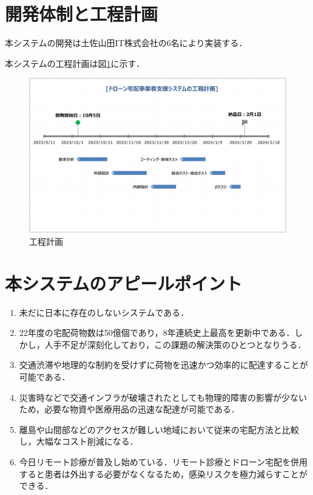 \documentclass[a4paper, titlepage]{jsarticle}
\begin{document}
\section{開発体制と工程計画}
本システムの開発は土佐山田IT株式会社の6名により実装する．

本システムの工程計画は図\ref{schedule}に示す．
\begin{figure}[htbp]
        \label{schedule}
        \centering
        \includegraphics[width=15cm]{schedule.pdf}
        \caption{工程計画}
\end{figure}

\section{本システムのアピールポイント}
\begin{enumerate}
        \item 未だに日本に存在のしないシステムである．
        \item 22年度の宅配荷物数は50億個であり，8年連続史上最高を更新中である．しかし，人手不足が深刻化しており，この課題の解決策のひとつとなりうる．
        \item 交通渋滞や地理的な制約を受けずに荷物を迅速かつ効率的に配達することが可能である．
        \item 災害時などで交通インフラが破壊されたとしても物理的障害の影響が少ないため，必要な物資や医療用品の迅速な配達が可能である．
        \item 離島や山間部などのアクセスが難しい地域において従来の宅配方法と比較し，大幅なコスト削減になる．
        \item 今日リモート診療が普及し始めている．リモート診療とドローン宅配を併用すると患者は外出する必要がなくなるため，感染リスクを極力減らすことができる．
\end{enumerate}
\end{document}
